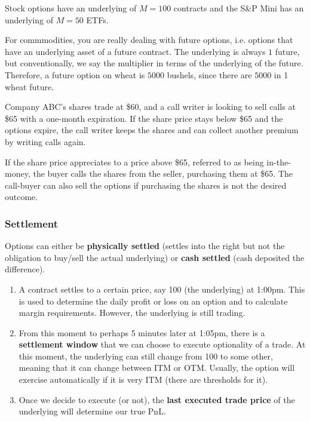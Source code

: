 \documentclass{article}
\begin{document}
      \begin{example}
        Stock options have an underlying of $M = 100$ contracts and the S\&P Mini has an underlying of $M = 50$ ETFs. 
      \end{example}

      \begin{example}
        For commmodities, you are really dealing with future options, i.e. options that have an underlying asset of a future contract. The underlying is always $1$ future, but conventionally, we say the multiplier in terms of the underlying of the future. Therefore, a future option on wheat is $5000$ bushels, since there are $5000$ in 1 wheat future. 
      \end{example}

      \begin{example}
        Company ABC's shares trade at \$60, and a call writer is looking to sell calls at \$65 with a one-month expiration. If the share price stays below \$65 and the options expire, the call writer keeps the shares and can collect another premium by writing calls again. 

        If the share price appreciates to a price above \$65, referred to as being in-the-money, the buyer calls the shares from the seller, purchasing them at \$65. The call-buyer can also sell the options if purchasing the shares is not the desired outcome.
      \end{example}

    \subsubsection{Settlement}

      Options can either be \textbf{physically settled} (settles into the right but not the obligation to buy/sell the actual underlying) or \textbf{cash settled} (cash deposited the difference). 
      \begin{enumerate}
        \item A contract settles to a certain price, say 100 (the underlying) at 1:00pm. This is used to determine the daily profit or loss on an option and to calculate margin requirements. However, the underlying is still trading. 

        \item From this moment to perhaps 5 minutes later at 1:05pm, there is a \textbf{settlement window} that we can choose to execute optionality of a trade. At this moment, the underlying can still change from 100 to some other, meaning that it can change between ITM or OTM. Usually, the option will exercise automatically if it is very ITM (there are thresholds for it). 

        \item Once we decide to execute (or not), the \textbf{last executed trade price} of the underlying will determine our true PnL. 
      \end{enumerate}
\end{document}
